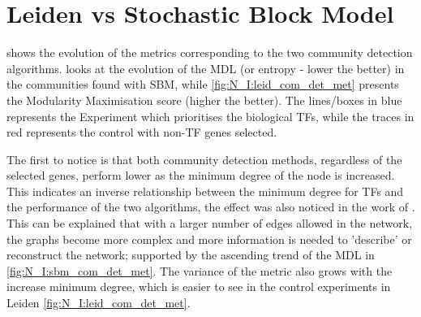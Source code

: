 \section{Leiden vs Stochastic Block Model}

 shows the evolution of the metrics corresponding to the two community detection algorithms.  looks at the evolution of the MDL (or entropy - lower the better) in the communities found with SBM, while \cref{fig:N_I:leid_com_det_met} presents the Modularity Maximisation score (higher the better). The lines/boxes in blue represents the Experiment which prioritises the biological TFs, while the traces in red represents the control with non-TF genes selected. 

The first to notice is that both community detection methods, regardless of the selected genes, perform lower as the minimum degree of the node is increased. This indicates an inverse relationship between the minimum degree for TFs and the performance of the two algorithms, the effect was also noticed in the work of \citet{Care2019-ij}. This can be explained that with a larger number of edges allowed in the network, the graphs become more complex and more information is needed to 'describe' or reconstruct the network; supported by the ascending trend of the MDL in \cref{fig:N_I:sbm_com_det_met}. The variance of the metric also grows with the increase minimum degree, which is easier to see in the control experiments in Leiden \cref{fig:N_I:leid_com_det_met}.


